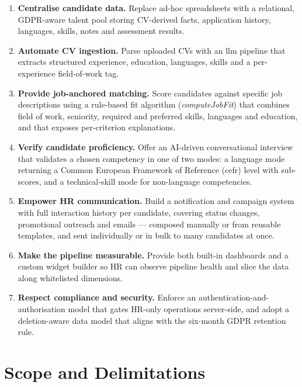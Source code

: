 \begin{enumerate}
	\item \textbf{Centralise candidate data.} Replace ad-hoc spreadsheets
	with a relational, GDPR-aware talent pool storing CV-derived facts,
	application history, languages, skills, notes and assessment results.

	\item \textbf{Automate CV ingestion.} Parse uploaded CVs with an
	\gls{llm} pipeline that extracts structured experience, education,
	languages, skills and a per-experience field-of-work tag.

	\item \textbf{Provide job-anchored matching.} Score candidates against
	specific job descriptions using a rule-based fit algorithm
	(\textit{computeJobFit}) that combines field of work, seniority,
	required and preferred skills, languages and education, and that
	exposes per-criterion explanations.

	\item \textbf{Verify candidate proficiency.} Offer an AI-driven
	conversational interview that validates a chosen competency in one of
	two modes: a language mode returning a Common European Framework of
	Reference (\gls{cefr}) level with sub-scores, and a technical-skill mode
	for non-language competencies.

	\item \textbf{Empower HR communication.} Build a notification and
	campaign system with full interaction history per candidate, covering
	status changes, promotional outreach and emails --- composed manually
	or from reusable templates, and sent individually or in bulk to many
	candidates at once.

	\item \textbf{Make the pipeline measurable.} Provide both built-in
	dashboards and a custom widget builder so HR can observe pipeline
	health and slice the data along whitelisted dimensions.

	\item \textbf{Respect compliance and security.} Enforce an
	authentication-and-authorisation model that gates HR-only operations
	server-side, and adopt a deletion-aware data model that aligns with
	the six-month GDPR retention rule.
\end{enumerate}


\section{Scope and Delimitations}
\label{sec:scope}

